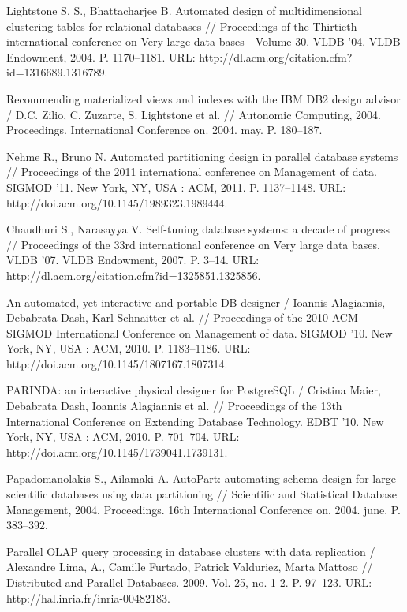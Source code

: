 \documentclass[unicode]{beamer}
\begin{document}
\begin{frame}[allowframebreaks]
{\begin{thebibliography}{99}
 Lightstone S. S., Bhattacharjee B. Automated design of multidimensional clustering tables for relational databases // Proceedings of the Thirtieth international conference on Very large data bases - Volume 30. VLDB ’04. VLDB Endowment, 2004. P. 1170--1181. URL: http://dl.acm.org/citation.cfm?id=1316689.1316789.

 Recommending materialized views and indexes with the {IBM DB2} design advisor / D.C. Zilio, C. Zuzarte, S. Lightstone et al. // Autonomic Computing, 2004. Proceedings. International Conference on. 2004. may. P. 180--187.

 Nehme R., Bruno N. Automated partitioning design in parallel database systems // Proceedings of the 2011 international conference on Management of data. SIGMOD ’11. New York, NY, USA : ACM, 2011. P. 1137--1148. URL: http://doi.acm.org/10.1145/1989323.1989444.

 Chaudhuri S., Narasayya V. Self-tuning database systems: a decade of progress // Proceedings of the 33rd international conference on Very large
data bases. VLDB ’07. VLDB Endowment, 2007. P. 3--14. URL: http://dl.acm.org/citation.cfm?id=1325851.1325856.

 An automated, yet interactive and portable DB designer / Ioannis Alagiannis, Debabrata Dash, Karl Schnaitter et al. // Proceedings of the 2010 ACM SIGMOD International Conference on Management of data. SIGMOD ’10. New York, NY, USA : ACM, 2010. P. 1183--1186. URL: http://doi.acm.org/10.1145/1807167.1807314.

 PARINDA: an interactive physical designer for PostgreSQL / Cristina Maier, Debabrata Dash, Ioannis Alagiannis et al. // Proceedings of the 13th International Conference on Extending Database Technology. EDBT ’10. New York, NY, USA : ACM, 2010. P. 701--704. URL: http://doi.acm.org/10.1145/1739041.1739131.

 Papadomanolakis S., Ailamaki A. AutoPart: automating schema design for large scientific databases using data partitioning // Scientific and Statistical Database Management, 2004. Proceedings. 16th International Conference on. 2004. june. P. 383--392.

 Parallel OLAP query processing in database clusters with data replication / Alexandre Lima, A., Camille Furtado, Patrick Valduriez, Marta Mattoso // Distributed and Parallel Databases. 2009. Vol. 25, no. 1-2. P. 97--123. URL: http://hal.inria.fr/inria-00482183.


\end{thebibliography}}
\end{frame}
\end{document}
